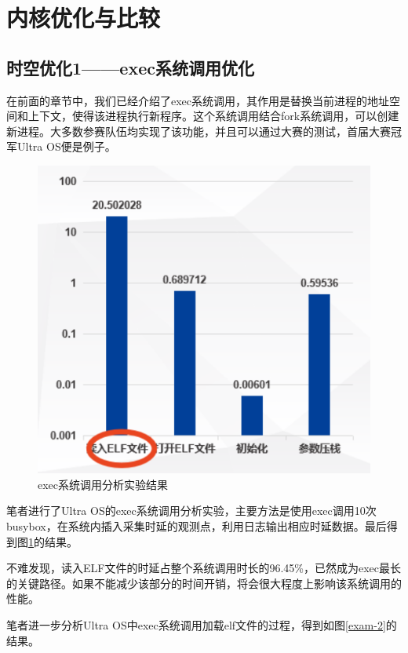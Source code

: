 \section{内核优化与比较}
\subsection{时空优化1——exec系统调用优化}

在前面的章节中，我们已经介绍了exec系统调用，其作用是替换当前进程的地址空间和上下文，使得该进程执行新程序。这个系统调用结合fork系统调用，可以创建新进程。大多数参赛队伍均实现了该功能，并且可以通过大赛的测试，首届大赛冠军Ultra OS便是例子。

\begin{figure}[htbp]
	\centering
	\includegraphics[scale=0.5]{figures/10-04/10-04-exec系统调用分析实验结果.png}
	\caption{exec系统调用分析实验结果}
	\label{exam-1}
\end{figure} 

笔者进行了Ultra OS的exec系统调用分析实验，主要方法是使用exec调用10次busybox，在系统内插入采集时延的观测点，利用日志输出相应时延数据。最后得到图\ref{exam-1}的结果。


不难发现，读入ELF文件的时延占整个系统调用时长的96.45\%，已然成为exec最长的关键路径。如果不能减少该部分的时间开销，将会很大程度上影响该系统调用的性能。

笔者进一步分析Ultra OS中exec系统调用加载elf文件的过程，得到如图\ref{exam-2}的结果。

